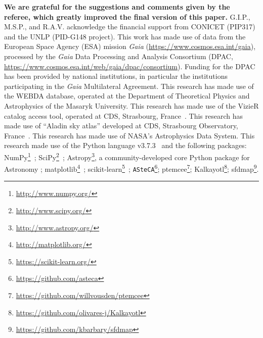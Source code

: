 \documentclass[referee]{aa}
\begin{document}

\begin{acknowledgements}
\textbf{We are grateful for the suggestions and comments given by the referee,
which greatly improved the final version of this paper.}
G.I.P., M.S.P., and R.A.V. acknowledge the financial support from CONICET 
(PIP317) and the UNLP (PID-G148 project).
%
This work has made use of data from the European Space Agency (ESA) mission
{\it Gaia} (\url{https://www.cosmos.esa.int/gaia}), processed by the {\it Gaia}
Data Processing and Analysis Consortium (DPAC,
\url{https://www.cosmos.esa.int/web/gaia/dpac/consortium}). Funding for the DPAC
has been provided by national institutions, in particular the institutions
participating in the {\it Gaia} Multilateral Agreement.
%
This research has made use of the WEBDA database, operated at the Department of
Theoretical Physics and Astrophysics of the Masaryk University.
%
This research has made use of the VizieR catalog access tool, operated at CDS,
Strasbourg, France~\citep{Ochsenbein_2000}.
%
This research has made use of ``Aladin sky atlas'' developed at
CDS, Strasbourg Observatory, France~\citep{Bonnarel2000,Boch2014}.
%
This research has made use of NASA's Astrophysics Data System.
%
This research made use of the Python language v3.7.3~\citep{vanRossum_1995}
and the following packages:
NumPy\footnote{\url{http://www.numpy.org/}}~\citep{vanDerWalt_2011};
SciPy\footnote{\url{http://www.scipy.org/}}~\citep{Jones_2001};
Astropy\footnote{\url{http://www.astropy.org/}}, a community-developed core
Python package for Astronomy \citep{astropy:2013, astropy:2018};
matplotlib\footnote{\url{http://matplotlib.org/}}~\citep{hunter_2007};
scikit-learn\footnote{\url{https://scikit-learn.org/}}~\citep{scikit-learn};
\texttt{ASteCA}\footnote{\url{https://github.com/asteca}};
ptemcee\footnote{\url{https://github.com/willvousden/ptemcee}};
Kalkayotl\footnote{\url{https://github.com/olivares-j/Kalkayotl}};
sfdmap\footnote{\url{https://github.com/kbarbary/sfdmap}}.
\end{acknowledgements}





\end{document}
